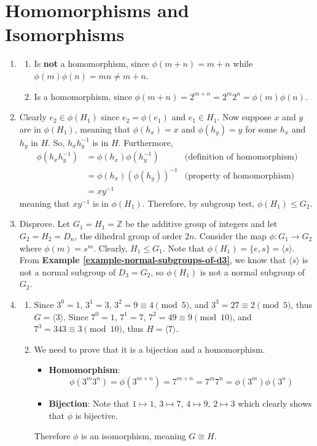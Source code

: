 \section{Homomorphisms and Isomorphisms}
\begin{enumerate}
    \item \begin{enumerate}[label=(\alph*)]
        \item Is \textbf{not} a homomorphism, since $\phi(m+n) = m + n$ while $\phi(m)\phi(n) = mn \neq m+n$.
        \item Is a homomorphism, since $\phi(m+n) = 2^{m+n} = 2^m2^n = \phi(m)\phi(n)$.
    \end{enumerate}

    \item Clearly $e_2 \in \phi(H_1)$ since $e_2 = \phi(e_1)$ and $e_1 \in H_1$. Now suppose $x$ and $y$ are in $\phi(H_1)$, meaning that $\phi(h_x) = x$ and $\phi(h_y) = y$ for some $h_x$ and $h_y$ in $H$. So, $h_xh_y^{-1}$ is in $H$. Furthermore,
    \begin{align*}
    \phi(h_xh_y^{-1}) &= \phi(h_x)\phi(h_y^{-1}) & \text{(definition of homomorphism)}\\
    &= \phi(h_x)\left(\phi(h_y)\right)^{-1} & \text{(property of homomorphism)}\\
    &= xy^{-1}
    \end{align*}
    meaning that $xy^{-1}$ is in $\phi(H_1)$. Therefore, by subgroup test, $\phi(H_1) \leq G_2$.

    \item Disprove. Let $G_1 = H_1 = \mathbb{Z}$ be the additive group of integers and let $G_2 = H_2 = D_n$, the dihedral group of order $2n$. Consider the map $\phi: G_1 \to G_2$ where $\phi(m) = s^m$. Clearly, $H_1 \leq G_1$. Note that $\phi(H_1) = \{e, s\} = \langle s \rangle$. From \textbf{Example \ref{example-normal-subgroups-of-d3}}, we know that $\langle s \rangle$ is not a normal subgroup of $D_3 = G_2$, so $\phi(H_1)$ is not a normal subgroup of $G_2$.

    \item \begin{enumerate}[label=(\roman*)]
        \item Since $3^0 = 1$, $3^1 = 3$, $3^2 = 9 \equiv 4 \pmod{5}$, and $3^3 = 27 \equiv 2 \pmod{5}$, thus $G = \langle 3 \rangle$. Since $7^0 = 1$, $7^1 = 7$, $7^2 = 49 \equiv 9 \pmod{10}$, and $7^3 = 343 \equiv 3 \pmod{10}$, thus $H = \langle 7 \rangle$.
        \item We need to prove that it is a bijection and a homomorphism.
        \begin{itemize}
            \item \textbf{Homomorphism}:
            \[
                \phi(3^m3^n) = \phi(3^{m+n}) = 7^{m+n} = 7^m7^n = \phi(3^m)\phi(3^n)
            \]
            \item \textbf{Bijection}: Note that $1 \mapsto 1$, $3 \mapsto 7$, $4 \mapsto 9$, $2 \mapsto 3$ which clearly shows that $\phi$ is bijective.
        \end{itemize}
        Therefore $\phi$ is an isomorphism, meaning $G \cong H$.
    \end{enumerate}


\end{enumerate}
